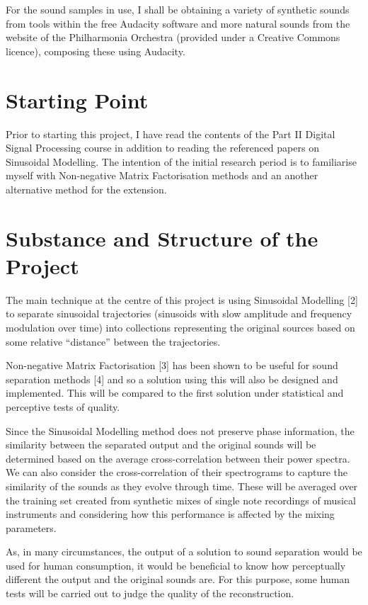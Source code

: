 \documentclass[12pt,a4paper,twoside,openright]{report}
\begin{document}
For the sound samples in use, I shall be obtaining a variety of synthetic sounds from tools within the free Audacity software and more natural sounds from the website of the Philharmonia Orchestra (provided under a Creative Commons licence), composing these using Audacity.

\section*{Starting Point}

Prior to starting this project, I have read the contents of the Part II Digital Signal Processing course in addition to reading the referenced papers on Sinusoidal Modelling. The intention of the initial research period is to familiarise myself with Non-negative Matrix Factorisation methods and an another alternative method for the extension.

\section*{Substance and Structure of the Project}

The main technique at the centre of this project is using Sinusoidal Modelling [2] to separate sinusoidal trajectories (sinusoids with slow amplitude and frequency modulation over time) into collections representing the original sources based on some relative ``distance'' between the trajectories.

Non-negative Matrix Factorisation [3] has been shown to be useful for sound separation methods [4] and so a solution using this will also be designed and implemented. This will be compared to the first solution under statistical and perceptive tests of quality.

Since the Sinusoidal Modelling method does not preserve phase information, the similarity between the separated output and the original sounds will be determined based on the average cross-correlation between their power spectra. We can also consider the cross-correlation of their spectrograms to capture the similarity of the sounds as they evolve through time. These will be averaged over the training set created from synthetic mixes of single note recordings of musical instruments and considering how this performance is affected by the mixing parameters.

As, in many circumstances, the output of a solution to sound separation would be used for human consumption, it would be beneficial to know how perceptually different the output and the original sounds are. For this purpose, some human tests will be carried out to judge the quality of the reconstruction.
\end{document}
